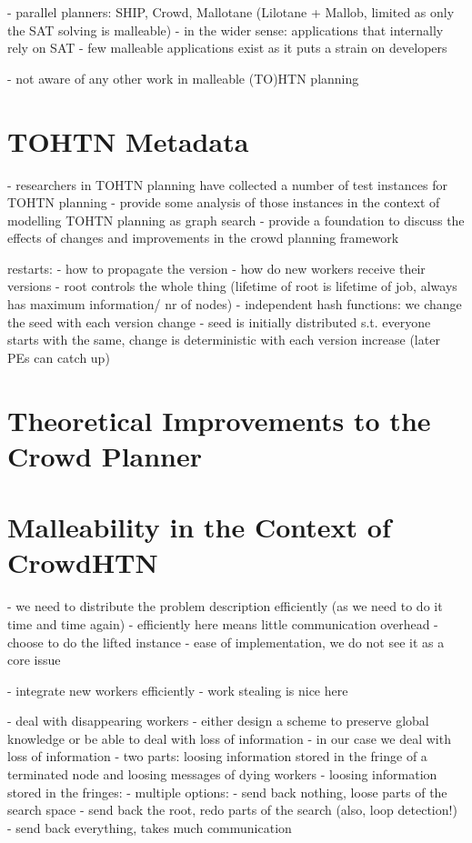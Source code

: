 \documentclass[enabledeprecatedfontcommands,12pt,a4paper,twoside]{scrartcl}
\numberwithin{equation}{section}
\begin{document}
- parallel planners: SHIP, Crowd, Mallotane (Lilotane + Mallob, limited as only the SAT solving is malleable)
- in the wider sense: applications that internally rely on SAT
- few malleable applications exist as it puts a strain on developers

- not aware of any other work in malleable (TO)HTN planning

\section{TOHTN Metadata}
- researchers in TOHTN planning have collected a number of test instances for TOHTN planning
- provide some analysis of those instances in the context of modelling TOHTN planning as graph search
- provide a foundation to discuss the effects of changes and improvements in the crowd planning framework

restarts:
- how to propagate the version
- how do new workers receive their versions
- root controls the whole thing (lifetime of root is lifetime of job, always has maximum information/ nr of nodes)
- independent hash functions: we change the seed with each version change
- seed is initially distributed s.t. everyone starts with the same, change is deterministic with each version increase (later PEs can catch up)

\section{Theoretical Improvements to the Crowd Planner}




\section{Malleability in the Context of CrowdHTN}
- we need to distribute the problem description efficiently (as we need to do it time and time again)
	- efficiently here means little communication overhead
	- choose to do the lifted instance
	- ease of implementation, we do not see it as a core issue

- integrate new workers efficiently
	- work stealing is nice here

- deal with disappearing workers
	- either design a scheme to preserve global knowledge or be able to deal with loss of information
	- in our case we deal with loss of information
	- two parts: loosing information stored in the fringe of a terminated node and loosing messages of dying workers
	- loosing information stored in the fringes:
		- multiple options:
			- send back nothing, loose parts of the search space
			- send back the root, redo parts of the search (also, loop detection!)
			- send back everything, takes much communication
			
\end{document}
